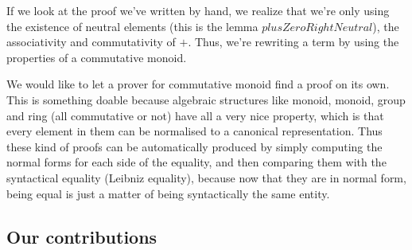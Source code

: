 If we look at the proof we've written by hand, we realize that we're only using the existence of neutral elements (this is the lemma $plusZeroRightNeutral$), the associativity and commutativity of $+$. Thus, we're rewriting a term by using the properties of a commutative monoid.

We would like to let a prover for commutative monoid find a proof on its own. This is something doable because algebraic structures like monoid, monoid, group and ring (all commutative or not) have all a very nice property, which is that every element in them can be normalised to a canonical representation. Thus these kind of proofs can be automatically produced by simply computing the normal forms for each side of the equality, and then comparing them with the syntactical equality (Leibniz equality), because now that they are in normal form, being equal is just a matter of being syntactically the same entity.

\subsection{Our contributions}

